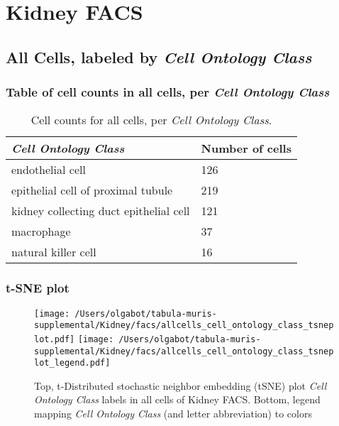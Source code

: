 \clearpage
\section{Kidney FACS}

\subsection{All Cells, labeled by \emph{Cell Ontology Class}}
\subsubsection{Table of cell counts in all cells, per \emph{Cell Ontology Class}}\begin{table}[h]
\centering
\label{my-label}
\begin{tabular}{@{}ll@{}}
\toprule

\emph{Cell Ontology Class}& Number of cells \\ \midrule
endothelial cell & 126 \\

epithelial cell of proximal tubule & 219 \\

kidney collecting duct epithelial cell & 121 \\

macrophage & 37 \\

natural killer cell & 16 \\
\bottomrule
\end{tabular}
\caption{Cell counts for all cells, per \emph{Cell Ontology Class}.}
\end{table}

\clearpage
\subsubsection{t-SNE plot}
\begin{figure}[h]
\centering
\texttt{[image: /Users/olgabot/tabula-muris-supplemental/Kidney/facs/allcells\_cell\_ontology\_class\_tsneplot.pdf]}
\texttt{[image: /Users/olgabot/tabula-muris-supplemental/Kidney/facs/allcells\_cell\_ontology\_class\_tsneplot\_legend.pdf]}
\caption{Top, t-Distributed stochastic neighbor embedding (tSNE) plot  \emph{Cell Ontology Class} labels in all cells of Kidney FACS. Bottom, legend mapping \emph{Cell Ontology Class} (and letter abbreviation) to colors}
\end{figure}


